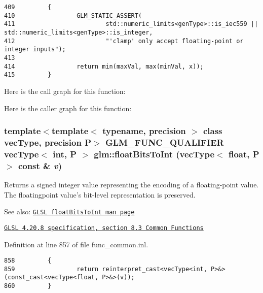\begin{Code}\begin{verbatim}409         {
410                 GLM_STATIC_ASSERT(
411                         std::numeric_limits<genType>::is_iec559 || std::numeric_limits<genType>::is_integer,
412                         "'clamp' only accept floating-point or integer inputs");
413                 
414                 return min(maxVal, max(minVal, x));
415         }
\end{verbatim}
\end{Code}




Here is the call graph for this function:

Here is the caller graph for this function:\hypertarget{group__core__func__common_gfddf54fe5089c73ff7216e1aa9f02620}{
\subsubsection[floatBitsToInt]{\setlength{\rightskip}{0pt plus 5cm}template$<$template$<$ typename, precision $>$ class vecType, precision P$>$ GLM\_\-FUNC\_\-QUALIFIER vecType$<$ int, P $>$ glm::floatBitsToInt (vecType$<$ float, P $>$ const \& {\em v})}}
\label{group__core__func__common_gfddf54fe5089c73ff7216e1aa9f02620}


Returns a signed integer value representing the encoding of a floating-point value. The floatingpoint value's bit-level representation is preserved.

\begin{Desc}
\item[See also:]\href{http://www.opengl.org/sdk/docs/manglsl/xhtml/floatBitsToInt.xml}{\tt GLSL floatBitsToInt man page} 

\href{http://www.opengl.org/registry/doc/GLSLangSpec.4.20.8.pdf}{\tt GLSL 4.20.8 specification, section 8.3 Common Functions} \end{Desc}


Definition at line 857 of file func\_\-common.inl.

\begin{Code}\begin{verbatim}858         {
859                 return reinterpret_cast<vecType<int, P>&>(const_cast<vecType<float, P>&>(v));
860         }
\end{verbatim}
\end{Code}


